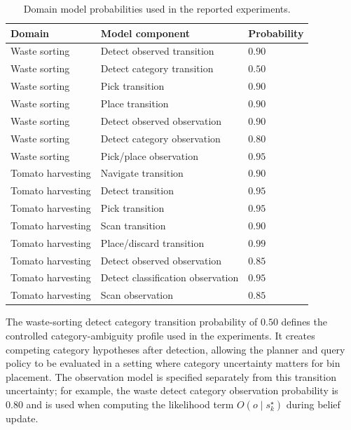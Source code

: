 \begin{table}[h]
\centering
\caption{Domain model probabilities used in the reported experiments.}
\label{tab:app_model_params}
\small
\begin{tabular}{lll}
\toprule
\textbf{Domain} & \textbf{Model component} & \textbf{Probability} \\
\midrule
Waste sorting & Detect observed transition & $0.90$ \\
Waste sorting & Detect category transition & $0.50$ \\
Waste sorting & Pick transition & $0.90$ \\
Waste sorting & Place transition & $0.90$ \\
Waste sorting & Detect observed observation & $0.90$ \\
Waste sorting & Detect category observation & $0.80$ \\
Waste sorting & Pick/place observation & $0.95$ \\
\midrule
Tomato harvesting & Navigate transition & $0.90$ \\
Tomato harvesting & Detect transition & $0.95$ \\
Tomato harvesting & Pick transition & $0.95$ \\
Tomato harvesting & Scan transition & $0.90$ \\
Tomato harvesting & Place/discard transition & $0.99$ \\
Tomato harvesting & Detect observed observation & $0.85$ \\
Tomato harvesting & Detect classification observation & $0.95$ \\
Tomato harvesting & Scan observation & $0.85$ \\
\bottomrule
\end{tabular}
\end{table}

The waste-sorting detect category transition probability of $0.50$ defines the controlled category-ambiguity profile used in the experiments. It creates competing category hypotheses after detection, allowing the planner and query policy to be evaluated in a setting where category uncertainty matters for bin placement. The observation model is specified separately from this transition uncertainty; for example, the waste detect category observation probability is $0.80$ and is used when computing the likelihood term $O(o \mid s_k^{\star})$ during belief update.


